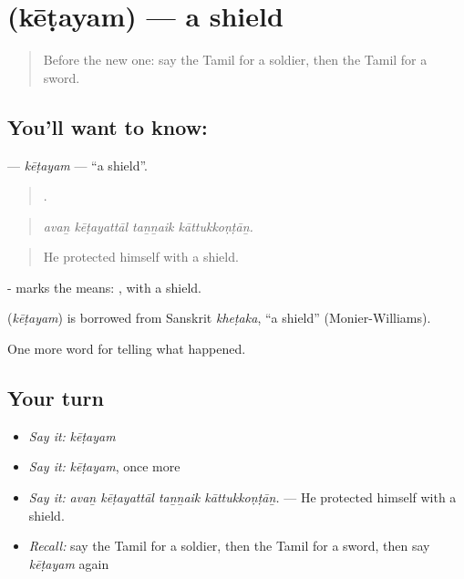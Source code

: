 \section[\texorpdfstring{\ta{கேடயம்} (kēṭayam)}{கேடயம் (kēṭayam)}]{ (kēṭayam) — a shield}

\label{lesson:TA-C333-ketayam}



\begin{quote}
Before the new one: say the Tamil for a soldier, then the Tamil for a sword.
\end{quote}

\subsection*{You'll want to know: }
\textbf{} — \emph{kēṭayam} — \textquotedblleft{}a shield\textquotedblright{}.

\begin{quote}
   .
\end{quote}

\begin{quote}
\emph{avaṉ kēṭayattāl taṉṉaik kāttukkoṇṭāṉ.}
\end{quote}

\begin{quote}
He protected himself with a shield.
\end{quote}

- marks the means: , with a shield.

\begin{cousinweb}
\textbf{} (\emph{kēṭayam}) is borrowed from Sanskrit \emph{kheṭaka}, \textquotedblleft{}a shield\textquotedblright{} (Monier-Williams).
\end{cousinweb}

\begin{grammarlens}[title={What you've built}]
One more word for telling what happened.
\end{grammarlens}

\subsection*{Your turn}
\begin{itemize}
\raggedright
  \item \emph{Say it:} \emph{kēṭayam}
  \item \emph{Say it:} \emph{kēṭayam}, once more
  \item \emph{Say it:} \emph{avaṉ kēṭayattāl taṉṉaik kāttukkoṇṭāṉ.} — He protected himself with a shield.
  \item \emph{Recall:} say the Tamil for a soldier, then the Tamil for a sword, then say \emph{kēṭayam} again
\end{itemize}

